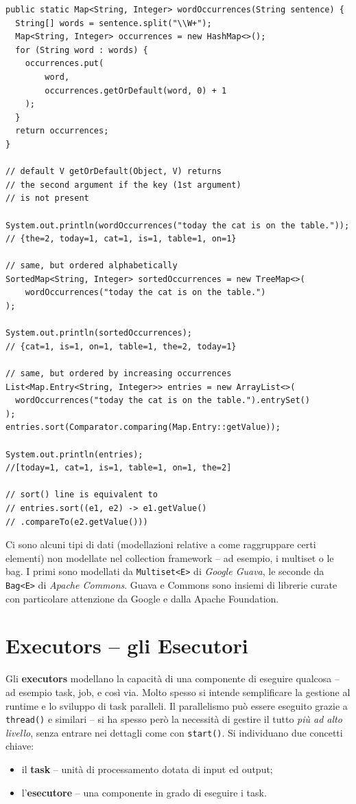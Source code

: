 \documentclass[\fontsizeclass,twocolumn]{\classname}
\theoremstyle{definition}
\theoremstyle{definition}
\begin{document}
\begin{lstlisting}
public static Map<String, Integer> wordOccurrences(String sentence) {
  String[] words = sentence.split("\\W+");
  Map<String, Integer> occurrences = new HashMap<>();
  for (String word : words) {
    occurrences.put(
        word,
        occurrences.getOrDefault(word, 0) + 1
    );
  }
  return occurrences;
}

// default V getOrDefault(Object, V) returns 
// the second argument if the key (1st argument) 
// is not present

System.out.println(wordOccurrences("today the cat is on the table."));
// {the=2, today=1, cat=1, is=1, table=1, on=1}

// same, but ordered alphabetically
SortedMap<String, Integer> sortedOccurrences = new TreeMap<>(
    wordOccurrences("today the cat is on the table.")
);

System.out.println(sortedOccurrences);
// {cat=1, is=1, on=1, table=1, the=2, today=1}

// same, but ordered by increasing occurrences
List<Map.Entry<String, Integer>> entries = new ArrayList<>(
  wordOccurrences("today the cat is on the table.").entrySet()
);
entries.sort(Comparator.comparing(Map.Entry::getValue));

System.out.println(entries);
//[today=1, cat=1, is=1, table=1, on=1, the=2]

// sort() line is equivalent to 
// entries.sort((e1, e2) -> e1.getValue()
// .compareTo(e2.getValue()))
\end{lstlisting}


Ci sono alcuni tipi di dati (modellazioni relative a come raggruppare certi
elementi) non modellate nel collection framework -- ad esempio, i multiset o le
bag. I primi sono modellati da \texttt{Multiset<E>} di \emph{Google Guava}, le
seconde da \texttt{Bag<E>} di \emph{Apache Commons}. Guava e Commons sono
insiemi di librerie curate con particolare attenzione da Google e dalla Apache
Foundation.

\chapter{Executors -- gli Esecutori}

Gli \textbf{executors} modellano la capacità di una componente di eseguire
qualcosa -- ad esempio task, job, e così via. Molto spesso si intende
semplificare la gestione al runtime e lo sviluppo di task paralleli. Il
parallelismo può essere eseguito grazie a \texttt{thread()} e similari -- si ha
spesso però la necessità di gestire il tutto \emph{più ad alto livello}, senza
entrare nei dettagli come con \texttt{start()}. Si individuano due concetti
chiave:
\begin{itemize}
    \item il \textbf{task} -- unità di processamento dotata di input ed output;
    \item l'\textbf{esecutore} -- una componente in grado di eseguire i task.
\end{itemize}
\end{document}
